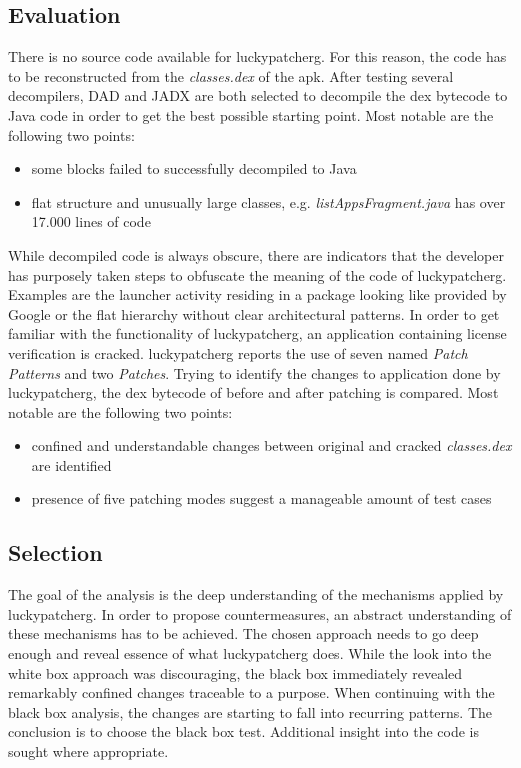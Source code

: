 \subsection{Evaluation}
There is no source code available for \gls{luckypatcherg}.
For this reason, the code has to be reconstructed from the \textit{classes.dex} of the \gls{apk}.
After testing several decompilers, DAD and JADX are both selected to decompile the dex bytecode to Java code in order to get the best possible starting point.
Most notable are the following two points:
\begin{itemize}
\item some blocks failed to successfully decompiled to Java
\item flat structure and unusually large classes, e.g. \textit{listAppsFragment.java} has over 17.000 lines of code
\end{itemize}
While decompiled code is always obscure, there are indicators that the developer has purposely taken steps to obfuscate the meaning of the code of \gls{luckypatcherg}.
Examples are the launcher activity residing in a package looking like provided by Google or the flat hierarchy without clear architectural patterns.
\newline
In order to get familiar with the functionality of \gls{luckypatcherg}, an application containing license verification is cracked.
\gls{luckypatcherg} reports the use of seven named \textit{Patch Patterns} and two \textit{Patches}.
Trying to identify the changes to application done by \gls{luckypatcherg}, the dex bytecode of before and after patching is compared.
Most notable are the following two points:
\begin{itemize}
\item confined and understandable changes between original and cracked \textit{classes.dex} are identified
\item presence of five patching modes suggest a manageable amount of test cases
\end{itemize}

\subsection{Selection}
The goal of the analysis is the deep understanding of the mechanisms applied by \gls{luckypatcherg}.
In order to propose countermeasures, an abstract understanding of these mechanisms has to be achieved.
The chosen approach needs to go deep enough and reveal essence of what \gls{luckypatcherg} does.
\newline
While the look into the white box approach was discouraging, the black box immediately revealed remarkably confined changes traceable to a purpose.
When continuing with the black box analysis, the changes are starting to fall into recurring patterns.
\newline
The conclusion is to choose the black box test.
Additional insight into the code is sought where appropriate.
